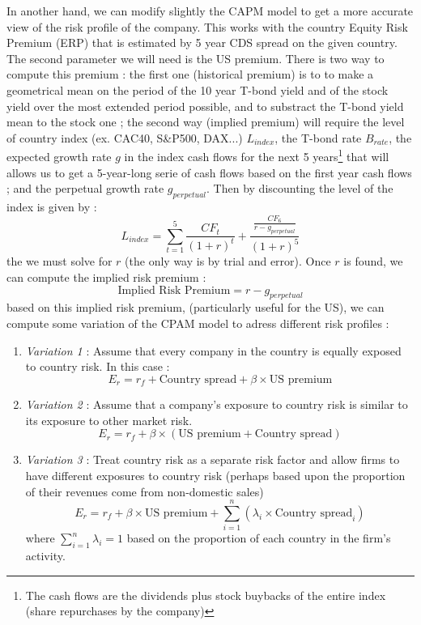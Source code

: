 In another hand, we can modify slightly the CAPM model to get a more accurate view of  the risk profile of the company. This works with the country Equity Risk Premium (ERP) that is estimated by 5 year CDS spread on the given country. The second parameter we will need is the US premium. There is two way to compute this premium : the first one (historical premium) is to to make a geometrical mean on the period of the 10 year T-bond yield and of the stock yield over the most extended period possible, and to substract the T-bond yield mean to the stock one ; the second way (implied premium) will require the level of country index (ex. CAC40, S\&P500, DAX...) $L_{index}$, the T-bond rate $B_{rate}$, the expected growth rate $g$ in the index cash flows for the next 5 years\footnote{The cash flows are the dividends plus stock buybacks of the entire index (share repurchases by the company)} that will allows us to get a 5-year-long serie of cash flows based on the first year cash flows ; and the perpetual growth rate $g_{perpetual}$. Then  by discounting the level of the index is given by :
\begin{equation}
L_{index} = \sum^5_{t=1}\frac{CF_t}{(1+r)^t} + \displaystyle\frac{\frac{CF_6}{r-g_{perpetual}}}{(1+r)^5}
\end{equation}
the we must solve for $r$ (the only way is by trial and error). Once $r$ is found, we can compute the implied risk premium : 
\begin{equation}
    \text{Implied Risk Premium} = r - g_{perpetual}
\end{equation}
based on this implied risk premium, (particularly useful for the US), we can compute some variation of the CPAM model to adress different risk profiles : 

\begin{enumerate}
    \item \textit{Variation 1} : Assume that every company in the country is equally exposed to country risk. In this case :
    \begin{equation}
        E_r = r_f + \text{Country spread} +\beta \times \text{US premium}
    \end{equation}


    \item \textit{Variation 2} : Assume that a company’s exposure to country risk is similar to its exposure to other market risk.
    \begin{equation}
        E_r = r_f + \beta\times(\text{US premium}+\text{Country spread})
    \end{equation}

    \item \textit{Variation 3} : Treat country risk as a separate risk factor and allow firms to have different exposures to country risk (perhaps based upon the proportion of their revenues come from non-domestic sales) 
    \begin{equation}
        E_r = r_f + \beta \times \text{US premium} + \sum_{i=1}^n(\lambda_i \times \text{Country spread}_i)
    \end{equation}
    where $\sum_{i=1}^n\lambda_i = 1$ based on the proportion of each country in the firm's activity.
\end{enumerate} 

